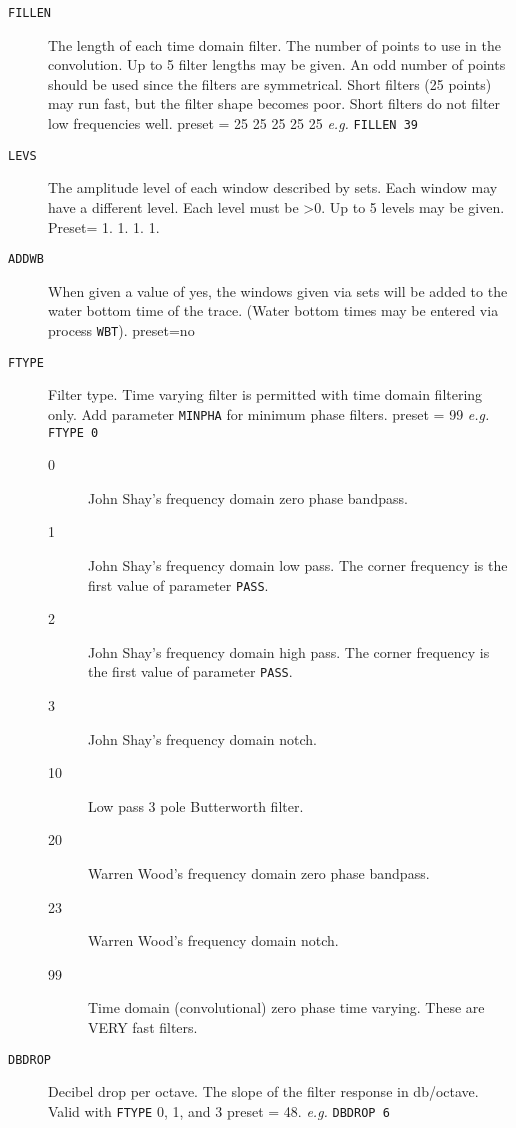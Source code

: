 \begin{description}
\item[\texttt{FILLEN}] The length of each time domain filter.  The number of points
         to use in the convolution.  Up to 5 filter lengths may be
         given.  An odd number of points should be used since the
         filters are symmetrical.  Short filters (25 points) may run
         fast, but the filter shape becomes poor.  Short filters do not
         filter low frequencies well.
         \Gls{preset} = 25 25 25 25 25  \textit{e.g.}  \texttt{FILLEN 39}

\item[\texttt{LEVS}] The amplitude level of each window described by sets. Each
         window may have a different level.  Each level must be >0.
         Up to 5 levels may be given.
         Preset= 1. 1. 1. 1.

\item[\texttt{ADDWB}] When given a value of yes, the windows given via sets will be
         added to the water bottom time of the trace.  (Water bottom
         times may be entered via process \texttt{WBT}).
         \Gls{preset}=no

\item[\texttt{FTYPE}] Filter type.  Time varying filter is permitted with time domain
         filtering only.  Add parameter \texttt{MINPHA} for minimum phase filters.
         \Gls{preset} = 99    \textit{e.g.}   \texttt{FTYPE 0}
\begin{description}
       \item[0] John Shay's frequency domain zero phase bandpass.
       \item[1] John Shay's frequency domain low pass. The corner frequency is the first value of parameter \texttt{PASS}.
       \item[2] John Shay's frequency domain high pass. The corner frequency is the first value of parameter \texttt{PASS}.
       \item[3] John Shay's frequency domain notch.
       \item[10] Low pass 3 pole Butterworth filter.
       \item[20] Warren Wood's frequency domain zero phase bandpass.
       \item[23] Warren Wood's frequency domain notch.
       \item[99] Time domain (convolutional) zero phase time varying.  These are VERY fast filters.
\end{description}

\item[\texttt{DBDROP}] Decibel drop per octave.  The slope of the filter response in
         db/octave.  Valid with \texttt{FTYPE} 0, 1, and 3
         \Gls{preset} = 48.   \textit{e.g.} \texttt{DBDROP 6}


\end{description}
